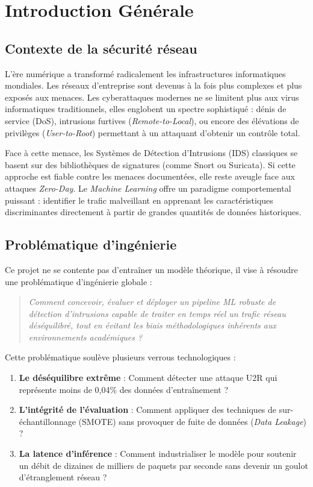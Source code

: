 \documentclass[12pt,a4paper]{report}
\begin{document}
\newpage
{}

\chapter{Introduction Générale}

\section{Contexte de la sécurité réseau}

L'ère numérique a transformé radicalement les infrastructures informatiques mondiales. Les réseaux d'entreprise sont devenus à la fois plus complexes et plus exposés aux menaces. Les cyberattaques modernes ne se limitent plus aux virus informatiques traditionnels, elles englobent un spectre sophistiqué : dénis de service (DoS), intrusions furtives (\textit{Remote-to-Local}), ou encore des élévations de privilèges (\textit{User-to-Root}) permettant à un attaquant d'obtenir un contrôle total.

Face à cette menace, les Systèmes de Détection d'Intrusions (IDS) classiques se basent sur des bibliothèques de signatures (comme Snort ou Suricata). Si cette approche est fiable contre les menaces documentées, elle reste aveugle face aux attaques \textit{Zero-Day}. Le \textit{Machine Learning} offre un paradigme comportemental puissant : identifier le trafic malveillant en apprenant les caractéristiques discriminantes directement à partir de grandes quantités de données historiques.

\section{Problématique d'ingénierie}

Ce projet ne se contente pas d'entraîner un modèle théorique, il vise à résoudre une problématique d'ingénierie globale :
\begin{quote}
    \textit{Comment concevoir, évaluer et déployer un pipeline ML robuste de détection d'intrusions capable de traiter en temps réel un trafic réseau déséquilibré, tout en évitant les biais méthodologiques inhérents aux environnements académiques ?}
\end{quote}

Cette problématique soulève plusieurs verrous technologiques :
\begin{enumerate}
    \item \textbf{Le déséquilibre extrême} : Comment détecter une attaque U2R qui représente moins de 0,04\% des données d'entraînement ?
    \item \textbf{L'intégrité de l'évaluation} : Comment appliquer des techniques de sur-échantillonnage (SMOTE) sans provoquer de fuite de données (\textit{Data Leakage}) ?
    \item \textbf{La latence d'inférence} : Comment industrialiser le modèle pour soutenir un débit de dizaines de milliers de paquets par seconde sans devenir un goulot d'étranglement réseau ?
\end{enumerate}
\end{document}
